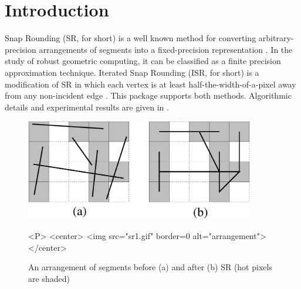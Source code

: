 \newcommand{\reals}{{\rm I\!\hspace{-0.025em} R}}

\def\A{{\cal A}}
\def\S{{\cal S}}

\section{Introduction}
Snap Rounding (SR, for short) is a well known method for converting
arbitrary-precision arrangements of segments into a fixed-precision
representation \cite{gght-srlse-97, gm-rad-98, h-psifp-99}. In
the study of robust geometric computing, it can be classified
as a finite precision approximation technique. Iterated Snap Rounding
(ISR, for short) is a modification of SR in which each vertex is at least
half-the-width-of-a-pixel away from any non-incident edge
\cite{cgal:hp-isr-02}. This package supports both methods. Algorithmic
details and experimental results are given in \cite{cgal:hp-isr-02}.

\begin{figure}
\begin{ccTexOnly}
\centerline{\includegraphics[width=10cm]{Snap_rounding_2/sr1}}
\end{ccTexOnly}


\label{fig:sr1}

\begin{ccHtmlOnly}
<P>
<center>
  <img src="sr1.gif"  border=0 alt="arrangement">
</center>
\end{ccHtmlOnly}

\caption{An arrangement of segments before (a) and after (b)
SR (hot pixels are shaded)}
\end{figure}


